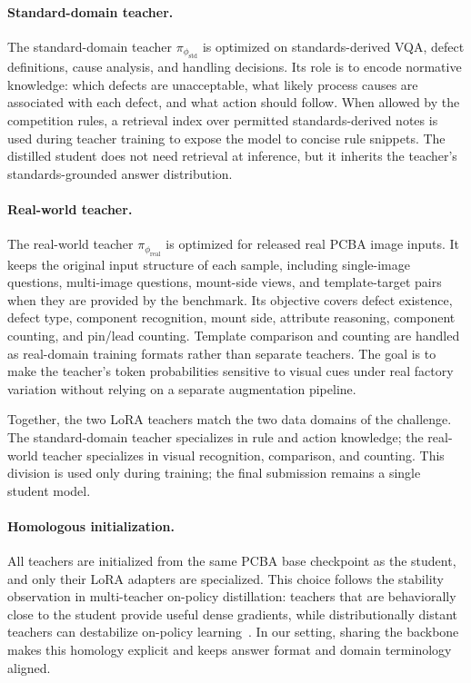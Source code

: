 \documentclass[sigconf, screen, review, anonymous]{acmart}
\begin{document}
\paragraph{Standard-domain teacher.}
The standard-domain teacher $\pi_{\phi_{\mathrm{std}}}$ is optimized on standards-derived VQA, defect definitions, cause analysis, and handling decisions. Its role is to encode normative knowledge: which defects are unacceptable, what likely process causes are associated with each defect, and what action should follow. When allowed by the competition rules, a retrieval index over permitted standards-derived notes is used during teacher training to expose the model to concise rule snippets. The distilled student does not need retrieval at inference, but it inherits the teacher's standards-grounded answer distribution.

\paragraph{Real-world teacher.}
The real-world teacher $\pi_{\phi_{\mathrm{real}}}$ is optimized for released real PCBA image inputs. It keeps the original input structure of each sample, including single-image questions, multi-image questions, mount-side views, and template-target pairs when they are provided by the benchmark. Its objective covers defect existence, defect type, component recognition, mount side, attribute reasoning, component counting, and pin/lead counting. Template comparison and counting are handled as real-domain training formats rather than separate teachers. The goal is to make the teacher's token probabilities sensitive to visual cues under real factory variation without relying on a separate augmentation pipeline.

Together, the two LoRA teachers match the two data domains of the challenge. The standard-domain teacher specializes in rule and action knowledge; the real-world teacher specializes in visual recognition, comparison, and counting. This division is used only during training; the final submission remains a single student model.

\paragraph{Homologous initialization.}
All teachers are initialized from the same PCBA base checkpoint as the student, and only their LoRA adapters are specialized. This choice follows the stability observation in multi-teacher on-policy distillation: teachers that are behaviorally close to the student provide useful dense gradients, while distributionally distant teachers can destabilize on-policy learning~\cite{ma2026mopd}. In our setting, sharing the backbone makes this homology explicit and keeps answer format and domain terminology aligned.
\end{document}
